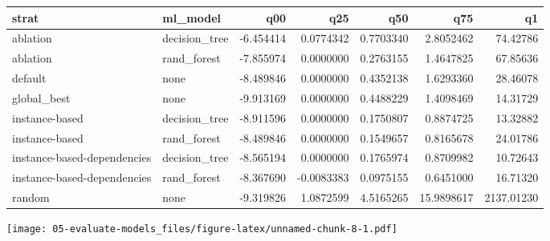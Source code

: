 \documentclass[
]{article}
\newenvironment{Shaded}{\begin{snugshade}}{\end{snugshade}}
\newcommand{\DataTypeTok}[1]{\textcolor[rgb]{0.13,0.29,0.53}{#1}}
\newcommand{\KeywordTok}[1]{\textcolor[rgb]{0.13,0.29,0.53}{\textbf{#1}}}
\newcommand{\NormalTok}[1]{#1}
\newcommand{\OperatorTok}[1]{\textcolor[rgb]{0.81,0.36,0.00}{\textbf{#1}}}
\newcommand{\StringTok}[1]{\textcolor[rgb]{0.31,0.60,0.02}{#1}}
\begin{document}
\begin{tabular}{l|l|r|r|r|r|r}
\hline
strat & ml\_model & q00 & q25 & q50 & q75 & q1\\
\hline
ablation & decision\_tree & -6.454414 & 0.0774342 & 0.7703340 & 2.8052462 & 74.42786\\
\hline
ablation & rand\_forest & -7.855974 & 0.0000000 & 0.2763155 & 1.4647825 & 67.85636\\
\hline
default & none & -8.489846 & 0.0000000 & 0.4352138 & 1.6293360 & 28.46078\\
\hline
global\_best & none & -9.913169 & 0.0000000 & 0.4488229 & 1.4098469 & 14.31729\\
\hline
instance-based & decision\_tree & -8.911596 & 0.0000000 & 0.1750807 & 0.8874725 & 13.32882\\
\hline
instance-based & rand\_forest & -8.489846 & 0.0000000 & 0.1549657 & 0.8165678 & 24.01786\\
\hline
instance-based-dependencies & decision\_tree & -8.565194 & 0.0000000 & 0.1765974 & 0.8709982 & 10.72643\\
\hline
instance-based-dependencies & rand\_forest & -8.367690 & -0.0083383 & 0.0975155 & 0.6451000 & 16.71320\\
\hline
random & none & -9.319826 & 1.0872599 & 4.5165265 & 15.9898617 & 2137.01230\\
\hline
\end{tabular}

\begin{Shaded}
\end{Shaded}

\texttt{[image: 05-evaluate-models\_files/figure-latex/unnamed-chunk-8-1.pdf]}
\end{document}
